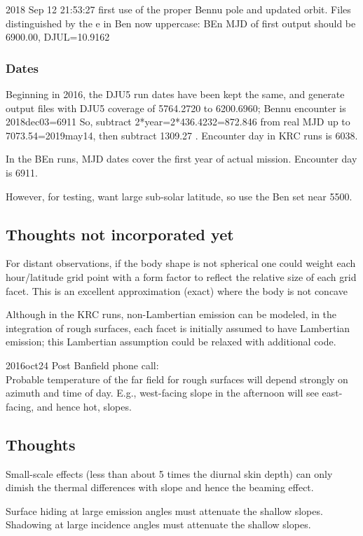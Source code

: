 \documentclass{article}
\begin{document}
 2018 Sep 12 21:53:27 first use of the proper Bennu pole and updated orbit.
 Files distinguished by the e in Ben now uppercase: BEn
MJD of first output should be 6900.00, DJUL=10.9162


\subsubsection{Dates}
Beginning in 2016, the DJU5 run dates have been kept the same, and generate
output files with DJU5 coverage of 5764.2720 to 6200.6960; Bennu encounter is
2018dec03=6911 So, subtract 2*year=2*436.4232=872.846 from real MJD up to
7073.54=2019may14, then subtract 1309.27 . Encounter day in KRC runs is 6038.

In the BEn runs, MJD dates cover the first year of actual mission. Encounter day is 6911.

However, for testing, want large sub-solar latitude,   so use the Ben set near 5500.


\subsection{Thoughts not incorporated yet}

For distant observations, if the body shape is not spherical one could weight
each hour/latitude grid point with a form factor to reflect the relative size of
each grid facet. This is an excellent approximation (exact) where the body is
not concave

Although in the KRC runs, non-Lambertian emission can be modeled, in the
integration of rough surfaces, each facet is initially assumed to have
Lambertian emission; this Lambertian assumption could be relaxed with additional
code.
 
2016oct24 Post Banfield phone call: 
\\ Probable temperature of the far field for rough surfaces will depend strongly
on azimuth and time of day. E.g., west-facing slope in the afternoon will see
east-facing, and hence hot, slopes.
 

\subsection{Thoughts}

 Small-scale effects (less than about 5 times the diurnal skin depth) can only
 dimish the thermal differences with slope and hence the beaming effect.

Surface hiding at large emission angles must attenuate the shallow slopes. 
Shadowing at large incidence angles must attenuate the shallow slopes.
\end{document}
